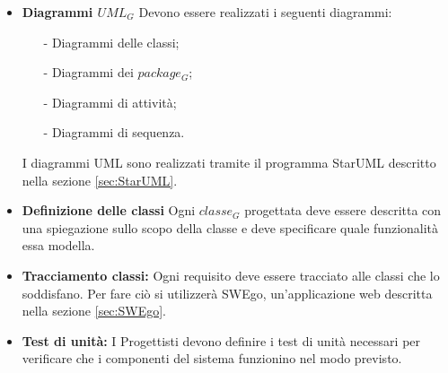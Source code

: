 				\begin{itemize}
					\item \textbf{Diagrammi $UML_G$}
					Devono essere realizzati i seguenti diagrammi:
					\begin{itemize}
						\item[-] Diagrammi delle classi;
						\item[-] Diagrammi dei $package_G$;
						\item[-] Diagrammi di attività;
						\item[-] Diagrammi di sequenza.
					\end{itemize}
				I diagrammi UML sono realizzati tramite il programma StarUML descritto nella sezione \ref{sec:StarUML}.
					\item \textbf{Definizione delle classi}
					Ogni $classe_G$ progettata deve essere descritta con una spiegazione sullo scopo della classe e deve specificare quale funzionalità essa modella. 
					\item \textbf{Tracciamento classi:}
					Ogni requisito deve essere tracciato alle classi che lo soddisfano. Per fare ciò si utilizzerà SWEgo, un'applicazione web descritta nella sezione \ref{sec:SWEgo}.
					\item \textbf{Test di unità:}
					I Progettisti devono definire i test di unità necessari per verificare che i componenti del sistema funzionino nel modo previsto.
				\end{itemize}
			
			
